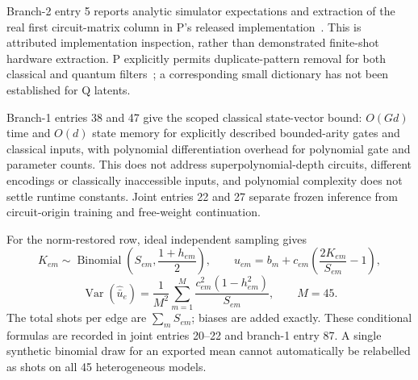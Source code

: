 \documentclass{article}
\begin{document}
Branch-2 entry 5 reports analytic simulator expectations and extraction of the real first circuit-matrix column in P's released implementation~\cite{Player,Pextract}. This is attributed implementation inspection, rather than demonstrated finite-shot hardware extraction. P explicitly permits duplicate-pattern removal for both classical and quantum filters~\cite{P}; a corresponding small dictionary has not been established for Q latents.

Branch-1 entries 38 and 47 give the scoped classical state-vector bound: \(O(Gd)\) time and \(O(d)\) state memory for explicitly described bounded-arity gates and classical inputs, with polynomial differentiation overhead for polynomial gate and parameter counts. This does not address superpolynomial-depth circuits, different encodings or classically inaccessible inputs, and polynomial complexity does not settle runtime constants. Joint entries 22 and 27 separate frozen inference from circuit-origin training and free-weight continuation.

For the norm-restored row, ideal independent sampling gives
\[
K_{em}\sim\operatorname{Binomial}\left(S_{em},\frac{1+h_{em}}{2}\right),
\qquad
\widehat u_{em}=b_m+c_{em}\left(\frac{2K_{em}}{S_{em}}-1\right),
\]
\[
\operatorname{Var}(\widehat{\bar u}_e)
=\frac{1}{M^2}\sum_{m=1}^{M}
\frac{c_{em}^2(1-h_{em}^2)}{S_{em}},\qquad M=45.
\]
The total shots per edge are \(\sum_mS_{em}\); biases are added exactly. These conditional formulas are recorded in joint entries 20--22 and branch-1 entry 87. A single synthetic binomial draw for an exported mean cannot automatically be relabelled as shots on all 45 heterogeneous models.
\end{document}
